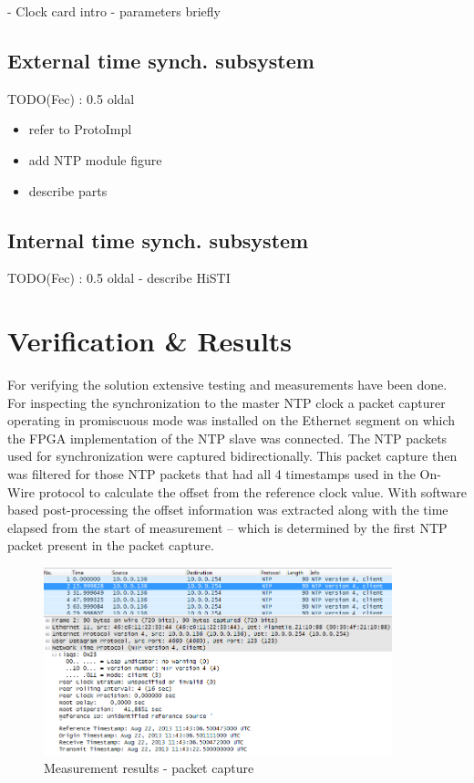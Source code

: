 \documentclass[article]{IEEEtran}
\begin{document}
- Clock card intro 
- parameters briefly

\subsection{External time synch. subsystem}
TODO(Fec) : 0.5 oldal
 \begin{itemize}
 	\item refer to ProtoImpl
 	\item add NTP module figure
 	\item describe parts
 \end{itemize}

\subsection{Internal time synch. subsystem}
TODO(Fec) : 0.5 oldal
- describe HiSTI

\section{Verification \& Results}


For verifying the solution extensive testing and measurements have been done. For inspecting the synchronization 
to the master NTP clock a packet capturer operating in promiscuous mode was installed on the Ethernet segment on which the FPGA implementation
of the NTP slave was connected. The NTP packets used for synchronization were captured bidirectionally. This packet
capture then was filtered for those NTP packets that had all 4 timestamps used in the On-Wire protocol to calculate the 
offset from the reference clock value. With software based post-processing the offset information was extracted along with the time elapsed from 
the start of measurement -- which is determined by the first NTP packet present in the packet capture.

\begin{figure}[!htb]
    \centering
    \includegraphics[width=0.9\textwidth]{figures_raw/pcap-NTP.png}
    \caption{Measurement results - packet capture}
    \label{fig:pcap-NTP}
\end{figure}
\end{document}
